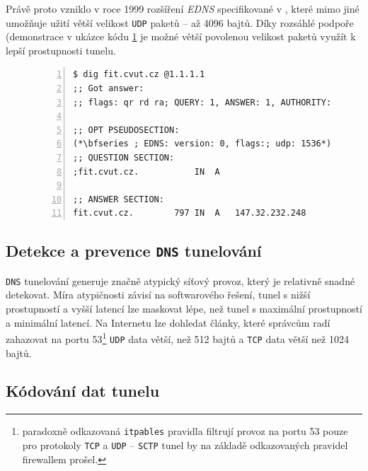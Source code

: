 \documentclass[thesis=M,czech]{FITthesis}[2012/10/20]
\begin{document}
    Právě proto vzniklo v roce 1999 rozšíření \textit{EDNS} specifikované v \cite[RFC 6891]{rfc6891}, které mimo jiné umožňuje užití větší velikost \texttt{UDP} paketů -- až 4096 bajtů. Díky rozsáhlé podpoře (demonstrace v ukázce kódu \ref{code:dig-dns} je možné větší povolenou velikost paketů využít k lepší prostupnosti tunelu.
    
    
    \begin{figure}[h]
	\begin{lstlisting}[caption=Část výstupu nástroje \texttt{dig} demonstrující užití \texttt{EDNS} v praxi (velikost \texttt{UDP} paketu 1536 bajtů od DNS serveru \texttt{1.1.1.1} (provozovatel \textit{Cloudflare} a \textit{APNIC}),frame=single,numbers=left]
$ dig fit.cvut.cz @1.1.1.1
;; Got answer:
;; flags: qr rd ra; QUERY: 1, ANSWER: 1, AUTHORITY: 0, ADDITIONAL: 1

;; OPT PSEUDOSECTION:
(*\bfseries ; EDNS: version: 0, flags:; udp: 1536*)
;; QUESTION SECTION:
;fit.cvut.cz.			IN	A

;; ANSWER SECTION:
fit.cvut.cz.		797	IN	A	147.32.232.248

      \end{lstlisting}
      \label{code:dig-dns}
    \end{figure}

    
    \subsection{Detekce a prevence \texttt{DNS} tunelování}
    
    \texttt{DNS} tunelování generuje značně atypický síťový provoz, který je relativně snadné detekovat\cite{bakalarka-detekce-tunelu}. Míra atypičnosti závisí na  softwarového řešení, tunel s nižší prostupností a vyšší latencí lze maskovat lépe, než tunel s maximální prostupností a minimální latencí. Na Internetu lze dohledat články, které správcům radí zahazovat na portu 53\footnote{paradoxně odkazovaná \texttt{itpables} pravidla filtrují provoz na portu 53 pouze pro protokoly \texttt{TCP} a \texttt{UDP} -- \texttt{SCTP} tunel by na základě odkazovaných pravidel firewallem prošel.} \texttt{UDP} data větší, než 512 bajtů a \texttt{TCP} data větší než 1024 bajtů\cite{dns-iptables}.
    
    
    \subsection{Kódování dat tunelu}
    \label{sec:dns-encoding}
    
\end{document}
